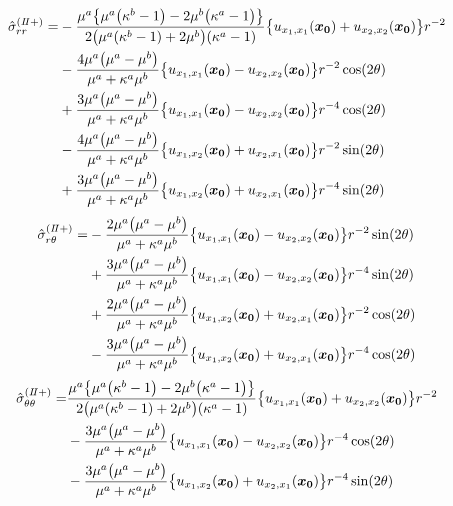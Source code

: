 \begin{align}
	\hat{\sigma}_{rr}^{(I\hspace{-.15em}I+)} =
	&-\frac{\mu^{a}\bigl\{ \mu^{a}\bigl(\kappa^{b}-1\bigr)-2\mu^{b}\bigl(\kappa^{a}-1\bigr)\bigr\}}
	{2\bigl(\mu^{a}(\kappa^{b}-1)+2\mu^{b}\bigr)(\kappa^{a}-1)}
	\bigl\{u_{x_{1},x_{1}}(\bm{x_{0}})+u_{x_{2},x_{2}}(\bm{x_{0}})\bigr\}r^{-2}
	\nonumber
	\\
	&-\frac{4\mu^{a}\bigl(\mu^{a}-\mu^{b}\bigr)}{\mu^{a}+\kappa^{a}\mu^{b}}
	\bigl\{u_{x_{1},x_{1}}(\bm{x_{0}})-u_{x_{2},x_{2}}(\bm{x_{0}})\bigr\}r^{-2}\cos(2\theta)
	\nonumber
	\\
	&+\frac{3\mu^{a}\bigl(\mu^{a}-\mu^{b}\bigr)}{\mu^{a}+\kappa^{a}\mu^{b}}
	\bigl\{u_{x_{1},x_{1}}(\bm{x_{0}})-u_{x_{2},x_{2}}(\bm{x_{0}})\bigr\}r^{-4}\cos(2\theta)
	\nonumber
	\\
	&-\frac{4\mu^{a}\bigl(\mu^{a}-\mu^{b}\bigr)}{\mu^{a}+\kappa^{a}\mu^{b}}
	\bigl\{u_{x_{1},x_{2}}(\bm{x_{0}})+u_{x_{2},x_{1}}(\bm{x_{0}})\bigr\}r^{-2}\sin(2\theta)
	\nonumber
	\\
	&+\frac{3\mu^{a}\bigl(\mu^{a}-\mu^{b}\bigr)}{\mu^{a}+\kappa^{a}\mu^{b}}
	\bigl\{u_{x_{1},x_{2}}(\bm{x_{0}})+u_{x_{2},x_{1}}(\bm{x_{0}})\bigr\}r^{-4}\sin(2\theta)
	\label{eq:SigmaRROut2Sol}
\end{align}
\begin{align}
	\hat{\sigma}_{r\theta}^{(I\hspace{-.15em}I+)} =
	&-\frac{2\mu^{a}\bigl(\mu^{a}-\mu^{b}\bigr)}{\mu^{a}+\kappa^{a}\mu^{b}}
	\bigl\{u_{x_{1},x_{1}}(\bm{x_{0}})-u_{x_{2},x_{2}}(\bm{x_{0}})\bigr\}r^{-2}\sin(2\theta)
	\nonumber
	\\
	&+\frac{3\mu^{a}\bigl(\mu^{a}-\mu^{b}\bigr)}{\mu^{a}+\kappa^{a}\mu^{b}}
	\bigl\{u_{x_{1},x_{1}}(\bm{x_{0}})-u_{x_{2},x_{2}}(\bm{x_{0}})\bigr\}r^{-4}\sin(2\theta)
	\nonumber
	\\
	&+\frac{2\mu^{a}\bigl(\mu^{a}-\mu^{b}\bigr)}{\mu^{a}+\kappa^{a}\mu^{b}}
	\bigl\{u_{x_{1},x_{2}}(\bm{x_{0}})+u_{x_{2},x_{1}}(\bm{x_{0}})\bigr\}r^{-2}\cos(2\theta)
	\nonumber
	\\
	&-\frac{3\mu^{a}\bigl(\mu^{a}-\mu^{b}\bigr)}{\mu^{a}+\kappa^{a}\mu^{b}}
	\bigl\{u_{x_{1},x_{2}}(\bm{x_{0}})+u_{x_{2},x_{1}}(\bm{x_{0}})\bigr\}r^{-4}\cos(2\theta)
	\label{eq:SigmaRThOut2Sol}
\end{align}
\begin{align}
	\hat{\sigma}_{\theta\theta}^{(I\hspace{-.15em}I+)} =
	&\frac{\mu^{a}\bigl\{ \mu^{a}\bigl(\kappa^{b}-1\bigr)-2\mu^{b}\bigl(\kappa^{a}-1\bigr)\bigr\}}
	{2\bigl(\mu^{a}(\kappa^{b}-1)+2\mu^{b}\bigr)(\kappa^{a}-1)}
	\bigl\{u_{x_{1},x_{1}}(\bm{x_{0}})+u_{x_{2},x_{2}}(\bm{x_{0}})\bigr\}r^{-2}
	\nonumber
	\\
	&-\frac{3\mu^{a}\bigl(\mu^{a}-\mu^{b}\bigr)}{\mu^{a}+\kappa^{a}\mu^{b}}
	\bigl\{u_{x_{1},x_{1}}(\bm{x_{0}})-u_{x_{2},x_{2}}(\bm{x_{0}})\bigr\}r^{-4}\cos(2\theta)
	\nonumber
	\\
	&-\frac{3\mu^{a}\bigl(\mu^{a}-\mu^{b}\bigr)}{\mu^{a}+\kappa^{a}\mu^{b}}
	\bigl\{u_{x_{1},x_{2}}(\bm{x_{0}})+u_{x_{2},x_{1}}(\bm{x_{0}})\bigr\}r^{-4}\sin(2\theta)
	\label{eq:SigmaThThOut2Sol}
\end{align}

